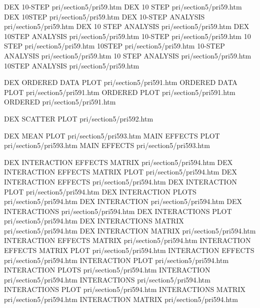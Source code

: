 DEX 10-STEP                             pri/section5/pri59.htm
DEX 10 STEP                             pri/section5/pri59.htm
DEX 10STEP                              pri/section5/pri59.htm
DEX 10-STEP ANALYSIS                    pri/section5/pri59.htm
DEX 10 STEP ANALYSIS                    pri/section5/pri59.htm
DEX 10STEP ANALYSIS                     pri/section5/pri59.htm
10-STEP                                 pri/section5/pri59.htm
10 STEP                                 pri/section5/pri59.htm
10STEP                                  pri/section5/pri59.htm
10-STEP ANALYSIS                        pri/section5/pri59.htm
10 STEP ANALYSIS                        pri/section5/pri59.htm
10STEP ANALYSIS                         pri/section5/pri59.htm

DEX ORDERED DATA PLOT                   pri/section5/pri591.htm
ORDERED DATA PLOT                       pri/section5/pri591.htm
ORDERED PLOT                            pri/section5/pri591.htm
ORDERED                                 pri/section5/pri591.htm

DEX SCATTER PLOT                        pri/section5/pri592.htm

DEX MEAN PLOT                           pri/section5/pri593.htm
MAIN EFFECTS PLOT                       pri/section5/pri593.htm
MAIN EFFECTS                            pri/section5/pri593.htm

DEX INTERACTION EFFECTS MATRIX          pri/section5/pri594.htm
DEX INTERACTION EFFECTS MATRIX PLOT     pri/section5/pri594.htm
DEX INTERACTION EFFECTS                 pri/section5/pri594.htm
DEX INTERACTION PLOT                    pri/section5/pri594.htm
DEX INTERACTION PLOTS                   pri/section5/pri594.htm
DEX INTERACTION                         pri/section5/pri594.htm
DEX INTERACTIONS                        pri/section5/pri594.htm
DEX INTERACTIONS PLOT                   pri/section5/pri594.htm
DEX INTERACTIONS MATRIX                 pri/section5/pri594.htm
DEX INTERACTION MATRIX                  pri/section5/pri594.htm
INTERACTION EFFECTS MATRIX              pri/section5/pri594.htm
INTERACTION EFFECTS MATRIX PLOT         pri/section5/pri594.htm
INTERACTION EFFECTS                     pri/section5/pri594.htm
INTERACTION PLOT                        pri/section5/pri594.htm
INTERACTION PLOTS                       pri/section5/pri594.htm
INTERACTION                             pri/section5/pri594.htm
INTERACTIONS                            pri/section5/pri594.htm
INTERACTIONS PLOT                       pri/section5/pri594.htm
INTERACTIONS MATRIX                     pri/section5/pri594.htm
INTERACTION MATRIX                      pri/section5/pri594.htm

